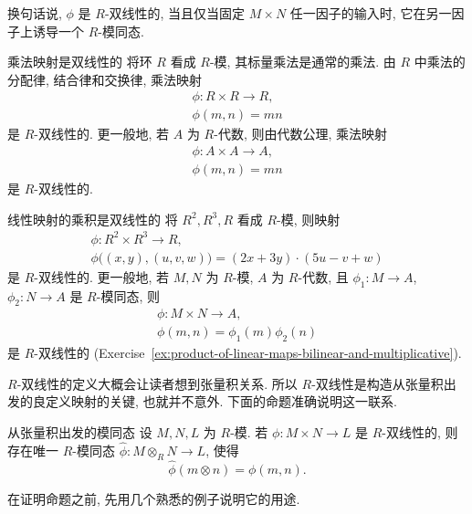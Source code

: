 换句话说, $\phi$ 是 $R$-双线性的, 当且仅当固定 $M\times N$ 任一因子的输入时, 它在另一因子上诱导一个 $R$-模同态.

\begin{Example}{乘法映射是双线性的}\leavevmode\label{ex:multiplication-maps-are-bilinear}
将环 $R$ 看成 $R$-模, 其标量乘法是通常的乘法. 由 $R$ 中乘法的分配律, 结合律和交换律, 乘法映射
\[
  \begin{gathered}
    \phi:R\times R\to R,\\
    \phi(m,n)=mn
  \end{gathered}
\]
是 $R$-双线性的. 更一般地, 若 $A$ 为 $R$-代数, 则由代数公理, 乘法映射
\[
  \begin{gathered}
    \phi:A\times A\to A,\\
    \phi(m,n)=mn
  \end{gathered}
\]
是 $R$-双线性的.
\end{Example}

\begin{Example}{线性映射的乘积是双线性的}\leavevmode\label{ex:products-of-linear-maps-are-bilinear}
将 $R^{2},R^{3},R$ 看成 $R$-模, 则映射
\[
  \begin{gathered}
    \phi:R^{2}\times R^{3}\to R,\\
    \phi\bigl((x,y),(u,v,w)\bigr)=(2x+3y)\cdot(5u-v+w)
  \end{gathered}
\]
是 $R$-双线性的. 更一般地, 若 $M,N$ 为 $R$-模, $A$ 为 $R$-代数, 且 $\phi_{1}:M\to A$, $\phi_{2}:N\to A$ 是 $R$-模同态, 则
\[
  \begin{gathered}
    \phi:M\times N\to A,\\
    \phi(m,n)=\phi_{1}(m)\phi_{2}(n)
  \end{gathered}
\]
是 $R$-双线性的 (Exercise~\ref{ex:product-of-linear-maps-bilinear-and-multiplicative}).
\end{Example}

$R$-双线性的定义大概会让读者想到张量积关系. 所以 $R$-双线性是构造从张量积出发的良定义映射的关键, 也就并不意外. 下面的命题准确说明这一联系.

\begin{Proposition}{从张量积出发的模同态}\leavevmode\label{prop:bilinear-maps-induce-tensor-module-maps}
设 $M,N,L$ 为 $R$-模. 若 $\phi:M\times N\to L$ 是 $R$-双线性的, 则存在唯一 $R$-模同态 $\widehat{\phi}:M\otimes_{R}N\to L$, 使得
\[
  \widehat{\phi}(m\otimes n)=\phi(m,n).
\]
\end{Proposition}

在证明命题之前, 先用几个熟悉的例子说明它的用途.


